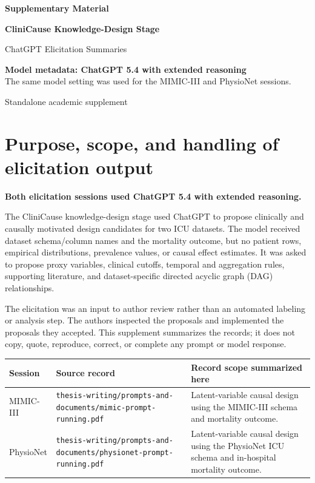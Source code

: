 \documentclass[11pt,a4paper]{article}
\newcommand{\sourcepath}[1]{{\footnotesize\nolinkurl{#1}}}
\begin{document}
\hypersetup{pageanchor=false}
\begin{titlepage}
  \centering
  \vspace*{0.20\textheight}
  {\LARGE\bfseries Supplementary Material\par}
  \vspace{1.2cm}
  {\huge\bfseries CliniCause Knowledge-Design Stage\par}
  \vspace{0.35cm}
  {\Large ChatGPT Elicitation Summaries\par}
  \vfill
  \begin{minipage}{0.84\textwidth}
    \centering\large
    \textbf{Model metadata: ChatGPT 5.4 with extended reasoning}\\[0.4em]
    The same model setting was used for the MIMIC-III and PhysioNet sessions.
  \end{minipage}
  \vfill
  {\large Standalone academic supplement\par}
\end{titlepage}
\hypersetup{pageanchor=true}

\tableofcontents
\clearpage

\section{Purpose, scope, and handling of elicitation output}
\textbf{Both elicitation sessions used ChatGPT 5.4 with extended reasoning.}

The CliniCause knowledge-design stage used ChatGPT to propose clinically and
causally motivated design candidates for two ICU datasets. The model received
dataset schema/column names and the mortality outcome, but no patient rows,
empirical distributions, prevalence values, or causal effect estimates. It was
asked to propose proxy variables, clinical cutoffs, temporal and aggregation
rules, supporting literature, and dataset-specific directed acyclic graph (DAG)
relationships.

The elicitation was an input to author review rather than an automated labeling
or analysis step. The authors inspected the proposals and implemented the
proposals they accepted. This supplement summarizes the records; it does not
copy, quote, reproduce, correct, or complete any prompt or model response.

\begin{table}[ht]
\centering
\small
\begin{tabularx}{\textwidth}{@{}lXX@{}}
\toprule
Session & Source record & Record scope summarized here \\
\midrule
MIMIC-III & \sourcepath{thesis-writing/prompts-and-documents/mimic-prompt-running.pdf} & Latent-variable causal design using the MIMIC-III schema and mortality outcome. \\
PhysioNet & \sourcepath{thesis-writing/prompts-and-documents/physionet-prompt-running.pdf} & Latent-variable causal design using the PhysioNet ICU schema and in-hospital mortality outcome. \\
\bottomrule
\end{tabularx}
\end{table}
\end{document}
